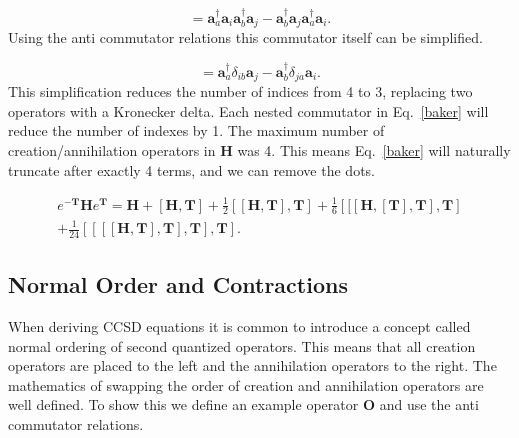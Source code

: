 \documentclass[graybox,sectrefs,envcountresetchap,open=right]{svmonodo}
\begin{document}
\begin{equation}
[\mathbf{a}^{\dagger}_a  \mathbf{a}_i 
, \mathbf{a}^{\dagger}_b \mathbf{a}_j] =
\mathbf{a}^{\dagger}_a  \mathbf{a}_i \mathbf{a}^{\dagger}_b \mathbf{a}_j
- \mathbf{a}^{\dagger}_b \mathbf{a}_j \mathbf{a}^{\dagger}_a  \mathbf{a}_i .
\end{equation} 
Using the anti commutator relations this commutator itself can be simplified.

\begin{equation}
[\mathbf{a}^{\dagger}_a  \mathbf{a}_i 
, \mathbf{a}^{\dagger}_b \mathbf{a}_j] =
\mathbf{a}^{\dagger}_a  \delta_{ib} \mathbf{a}_j
- \mathbf{a}^{\dagger}_b \delta_{ja} \mathbf{a}_i .
\end{equation} 
This simplification reduces the number of indices from 4 to 3, replacing two operators with a Kronecker delta. Each nested commutator in Eq.~\ref{baker} will reduce the number of indexes by 1. The maximum number of creation/annihilation operators in $\mathbf{H}$ was 4. This means Eq.~\ref{baker} will naturally truncate after exactly 4 terms, and we can remove the dots.

\begin{equation}
\begin{split}
e^{-\mathbf{T}} \mathbf{H} e^{\mathbf{T}} = 
\mathbf{H} 
+ \left[ \mathbf{H}, \mathbf{T} \right] 
+ \frac{1}{2} \left[ [\mathbf{H}, \mathbf{T}], \mathbf{T} \right] 
+ \frac{1}{6} \left[ [ [ \mathbf{H},[\mathbf{T}], \mathbf{T}], \mathbf{T} \right] \\
+ \frac{1}{24} \left[ [ [ [\mathbf{H}, \mathbf{T}], \mathbf{T}], \mathbf{T}], \mathbf{T}  \right] .
\end{split}  \label{variationalccsd}
\end{equation} 

\subsection{Normal Order and Contractions}
When deriving CCSD equations it is common to introduce a concept called normal ordering of second quantized operators. This means that all creation operators are placed to the left and the annihilation operators to the right. The mathematics of swapping the order of creation and annihilation operators are well defined. To show this we define an example operator $\mathbf{O}$ and use the anti commutator relations.
\end{document}
